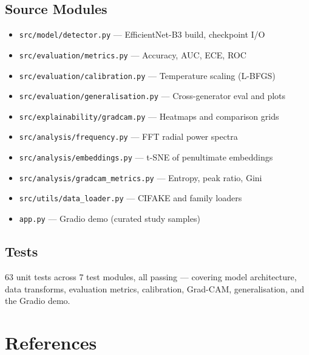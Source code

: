 \documentclass[12pt,a4paper]{article}
\begin{document}
\subsection*{Source Modules}
\begin{itemize}[noitemsep]
    \item \texttt{src/model/detector.py} --- EfficientNet-B3 build, checkpoint I/O
    \item \texttt{src/evaluation/metrics.py} --- Accuracy, AUC, ECE, ROC
    \item \texttt{src/evaluation/calibration.py} --- Temperature scaling (L-BFGS)
    \item \texttt{src/evaluation/generalisation.py} --- Cross-generator eval and plots
    \item \texttt{src/explainability/gradcam.py} --- Heatmaps and comparison grids
    \item \texttt{src/analysis/frequency.py} --- FFT radial power spectra
    \item \texttt{src/analysis/embeddings.py} --- t-SNE of penultimate embeddings
    \item \texttt{src/analysis/gradcam\_metrics.py} --- Entropy, peak ratio, Gini
    \item \texttt{src/utils/data\_loader.py} --- CIFAKE and family loaders
    \item \texttt{app.py} --- Gradio demo (curated study samples)
\end{itemize}

\subsection*{Tests}
63 unit tests across 7 test modules, all passing --- covering model architecture, data transforms, evaluation metrics, calibration, Grad-CAM, generalisation, and the Gradio demo.

\section*{References}
\end{document}
